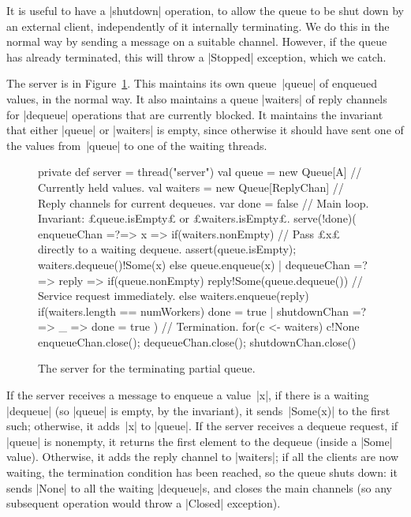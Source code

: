 
It is useful to have a |shutdown| operation, to allow the queue to be shut
down by an external client, independently of it internally terminating.  We do
this in the normal way by sending a message on a suitable channel.  However,
if the queue has already terminated, this will throw a |Stopped| exception, which
we catch.

The server is in Figure~\ref{fig:terminating-queue-server}.  This maintains
its own queue~|queue| of enqueued values, in the normal way.  It also
maintains a queue |waiters| of reply channels for |dequeue| operations that
are currently blocked.  It maintains the invariant that either |queue| or
|waiters| is empty, since otherwise it should have sent one of the values
from~|queue| to one of the waiting threads.  


\begin{figure}
\begin{scala}
  private def server = thread("server"){
    val queue = new Queue[A] // Currently held values.
    val waiters = new Queue[ReplyChan] // Reply channels for current dequeues.
    var done = false
    // Main loop.  Invariant: £queue.isEmpty£ or £waiters.isEmpty£.
    serve(!done)(
      enqueueChan =?=> { x => 
        if(waiters.nonEmpty){ // Pass £x£ directly to a waiting dequeue.
          assert(queue.isEmpty); waiters.dequeue()!Some(x)
        }
        else queue.enqueue(x)
      }
      | dequeueChan =?=> { reply =>
          if(queue.nonEmpty)
            reply!Some(queue.dequeue()) // Service request immediately.
          else{
            waiters.enqueue(reply)
            if(waiters.length == numWorkers) done = true
          }
        }
      | shutdownChan =?=> { _ => done = true }
    )
    // Termination.
    for(c <- waiters) c!None
    enqueueChan.close(); dequeueChan.close(); shutdownChan.close()
  }
\end{scala}
\caption{The server for the terminating partial queue.}
\label{fig:terminating-queue-server}
\end{figure}



If the server receives a message to enqueue a value~|x|, if there is a waiting
|dequeue| (so |queue| is empty, by the invariant), it sends~|Some(x)| to the
first such; otherwise, it adds~|x| to |queue|.  If the server receives a
dequeue request, if |queue| is nonempty, it returns the first element to the
dequeue (inside a |Some| value).  Otherwise, it adds the reply channel to
|waiters|; if all the clients are now waiting, the termination condition has
been reached, so the queue shuts down: it sends |None| to all the waiting
|dequeue|s, and closes the main channels (so any subsequent operation would
throw a |Closed| exception).

